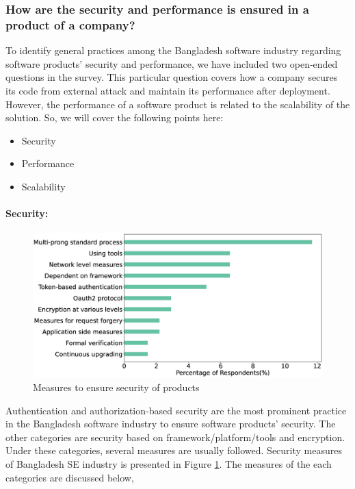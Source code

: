 \subsubsection{How are the security and performance is ensured in a product of a company?}
\label{security_performance}

To identify general practices among the Bangladesh software industry regarding software products' security and performance, we have included two open-ended questions in the survey. This particular question covers how a company secures its code from external attack and maintain its performance after deployment. However, the performance of a software product is related to the scalability of the solution. So, we will cover the following points here:
\begin{itemize}
    \item Security
    \item Performance
    \item Scalability
\end{itemize}


\paragraph{Security:}
\label{Security}

\begin{figure}[h]
\centering
\includegraphics[scale=0.22]{Figures/Security.eps} 
\caption{Measures to ensure security of products}
\label{fig:Measures to ensure security}
\end{figure}


Authentication and authorization-based security are the most prominent practice in the Bangladesh software industry to ensure software products' security. The other categories are security based on framework/platform/tools and encryption. Under these categories, several measures are usually followed. Security measures of Bangladesh SE industry is presented in Figure \ref{fig:Measures to ensure security}. The measures of the each categories are discussed below,

